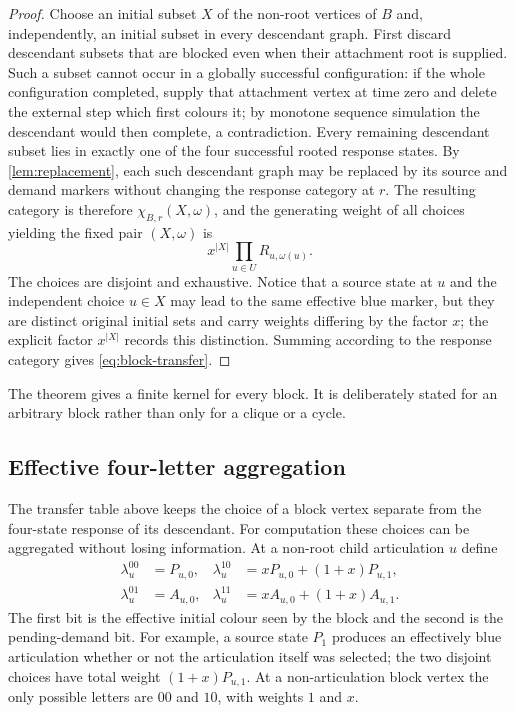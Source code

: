 \documentclass[11pt,reqno]{amsart}
\theoremstyle{definition}
\begin{document}
\begin{proof}
Choose an initial subset $X$ of the non-root vertices of $B$ and, independently, an initial subset in every descendant graph.  First discard descendant subsets that are blocked even when their attachment root is supplied.  Such a subset cannot occur in a globally successful configuration: if the whole configuration completed, supply that attachment vertex at time zero and delete the external step which first colours it; by monotone sequence simulation the descendant would then complete, a contradiction.  Every remaining descendant subset lies in exactly one of the four successful rooted response states.  By \cref{lem:replacement}, each such descendant graph may be replaced by its source and demand markers without changing the response category at $r$.  The resulting category is therefore $\chi_{B,r}(X,\omega)$, and the generating weight of all choices yielding the fixed pair $(X,\omega)$ is
\[
  x^{|X|}\prod_{u\in U}R_{u,\omega(u)}.
\]
The choices are disjoint and exhaustive.  Notice that a source state at $u$ and the independent choice $u\in X$ may lead to the same effective blue marker, but they are distinct original initial sets and carry weights differing by the factor $x$; the explicit factor $x^{|X|}$ records this distinction.  Summing according to the response category gives \eqref{eq:block-transfer}.
\end{proof}

The theorem gives a finite kernel for every block.  It is deliberately stated for an arbitrary block rather than only for a clique or a cycle.

\subsection{Effective four-letter aggregation}\label{subsec:effective-block}

The transfer table above keeps the choice of a block vertex separate from the
four-state response of its descendant.  For computation these choices can be
aggregated without losing information.  At a non-root child articulation $u$
define
\begin{align}
 \lambda_u^{00}&=P_{u,0},
 &\lambda_u^{10}&=xP_{u,0}+(1+x)P_{u,1},
 \label{eq:block-letter-a}\\
 \lambda_u^{01}&=A_{u,0},
 &\lambda_u^{11}&=xA_{u,0}+(1+x)A_{u,1}.
 \label{eq:block-letter-b}
\end{align}
The first bit is the effective initial colour seen by the block and the second
is the pending-demand bit.  For example, a source state $P_1$ produces
an effectively blue articulation whether or not the articulation itself was
selected; the two disjoint choices have total weight $(1+x)P_{u,1}$.  At a
non-articulation block vertex the only possible letters are $00$ and $10$,
with weights $1$ and $x$.
\end{document}
